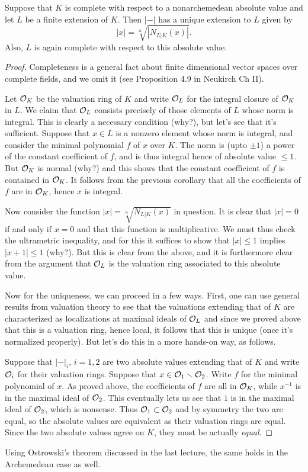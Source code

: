 \begin{theorem}
  Suppose that $K$ is complete with respect to a nonarchemedean absolute value and let $L$ be a finite extension of $K$.
  Then $|-|$ has a unique extension to $L$ given by
  \[ |x| = \sqrt[n]{|N_{L|K}(x)|}. \]
  Also, $L$ is again complete with respect to this absolute value.
\end{theorem}
\begin{proof}
  Completeness is a general fact about finite dimensional vector spaces over complete fields, and we omit it (see Proposition 4.9 in Neukirch Ch II).

  Let $\mathcal{O}_{K}$ be the valuation ring of $K$ and write $\mathcal{O}_{L}$ for the integral closure of $\mathcal{O}_{K}$ in $L$.
  We claim that $\mathcal{O}_{L}$ consists precisely of those elements of $L$ whose norm is integral.
  This is clearly a necessary condition (why?), but let's see that it's sufficient.
  Suppose that $x \in L$ is a nonzero element whose norm is integral, and consider the minimal polynomial $f$ of $x$ over $K$.
  The norm is (upto $\pm 1$) a power of the constant coefficient of $f$, and is thus integral hence of absolute value $\leq 1$.
  But $\mathcal{O}_{K}$ is normal (why?) and this shows that the constant coefficient of $f$ is contained in $\mathcal{O}_{K}$.
  It follows from the previous corollary that all the coefficients of $f$ are in $\mathcal{O}_{K}$, hence $x$ is integral.

  Now consider the function $|x| = \sqrt[n]{N_{L|K}(x)}$ in question.
  It is clear that $|x| = 0$ if and only if $x = 0$ and that this function is multiplicative.
  We must thus check the ultrametric inequality, and for this it suffices to show that $|x| \leq 1$ implies $|x+1| \leq 1$ (why?).
  But this is clear from the above, and it is furthermore clear from the argument that $\mathcal{O}_{L}$ is the valuation ring associated to this absolute value.

  Now for the uniqueness, we can proceed in a few ways.
  First, one can use general results from valuation theory to see that the valuations extending that of $K$ are characterized as localizations at maximal ideals of $\mathcal{O}_{L}$ and since we proved above that this is a valuation ring, hence local, it follows that this is unique (once it's normalized properly).
  But let's do this in a more hands-on way, as follows.

  Suppose that $|-|_{i}$, $i = 1,2$ are two absolute values extending that of $K$ and write $\mathcal{O}_{i}$ for their valuation rings.
  Suppose that $x \in \mathcal{O}_{1} \smallsetminus \mathcal{O}_{2}$.
  Write $f$ for the minimal polynomial of $x$.
  As proved above, the coefficients of $f$ are all in $\mathcal{O}_{K}$, while $x^{-1}$ is in the maximal ideal of $\mathcal{O}_{2}$.
  This eventually lets us see that $1$ is in the maximal ideal of $\mathcal{O}_{2}$, which is nonsense.
  Thus $\mathcal{O}_{1} \subset \mathcal{O}_{2}$ and by symmetry the two are equal, so the absolute values are equivalent as their valuation rings are equal.
  Since the two absolute values agree on $K$, they must be actually \emph{equal}.
\end{proof}
\begin{remark}
  Using Ostrowski's theorem discussed in the last lecture, the same holds in the Archemedean case as well.
\end{remark}

